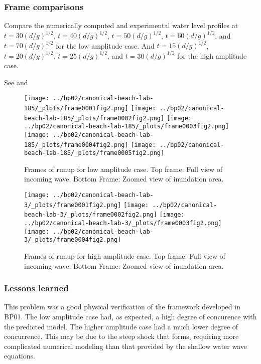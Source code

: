 \subsubsection{Frame comparisons}
Compare the numerically computed and experimental water level profiles at $t = 30(d/g)^{1/2}$, $t = 40(d/g)^{1/2}$, $t = 50(d/g)^{1/2}$, $t = 60(d/g)^{1/2}$, and $t = 70(d/g)^{1/2}$ for the low amplitude case. And $t = 15(d/g)^{1/2}$, $t = 20(d/g)^{1/2}$, $t = 25(d/g)^{1/2}$, and $t = 30(d/g)^{1/2}$ for the high amplitude case.

See  and 
\begin{figure}[ht]
\hfil\texttt{[image: ../bp02/canonical-beach-lab-185/\_plots/frame0001fig2.png]}\hfil
\hfil\texttt{[image: ../bp02/canonical-beach-lab-185/\_plots/frame0002fig2.png]}\hfil
\vskip 5pt
\hfil\texttt{[image: ../bp02/canonical-beach-lab-185/\_plots/frame0003fig2.png]}\hfil
\hfil\texttt{[image: ../bp02/canonical-beach-lab-185/\_plots/frame0004fig2.png]}\hfil
\vskip 5pt
\hfil\texttt{[image: ../bp02/canonical-beach-lab-185/\_plots/frame0005fig2.png]}\hfil
\caption{\label{fig:bp2framesa} 
Frames of runup for low amplitude case. Top frame: Full view of incoming wave. Bottom Frame: Zoomed view of inundation area.}
\end{figure}

\begin{figure}[ht]
\hfil\texttt{[image: ../bp02/canonical-beach-lab-3/\_plots/frame0001fig2.png]}\hfil
\hfil\texttt{[image: ../bp02/canonical-beach-lab-3/\_plots/frame0002fig2.png]}\hfil
\vskip 5pt
\hfil\texttt{[image: ../bp02/canonical-beach-lab-3/\_plots/frame0003fig2.png]}\hfil
\hfil\texttt{[image: ../bp02/canonical-beach-lab-3/\_plots/frame0004fig2.png]}\hfil
\caption{\label{fig:bp2framesb} 
Frames of runup for high amplitude case. Top frame: Full view of incoming wave. Bottom Frame: Zoomed view of inundation area.}
\end{figure}

\subsubsection{Lessons learned}

This problem was a good physical verification of the framework
developed in BP01. The low amplitude case had, as expected, a high
degree of concurence with the predicted model. The higher amplitude
case had a much lower degree of concurrence. This may be due to the
steep shock that forms, requiring more complicated numerical modeling
than that provided by the shallow water wave equations.
